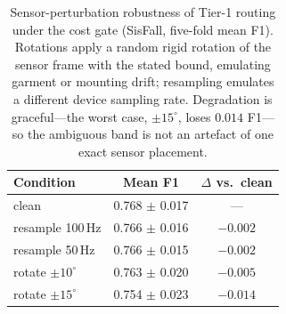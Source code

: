 \begin{table}[!t]
\centering
\caption{Sensor-perturbation robustness of Tier-1 routing under the cost gate (SisFall, five-fold mean F1). Rotations apply a random rigid rotation of the sensor frame with the stated bound, emulating garment or mounting drift; resampling emulates a different device sampling rate. Degradation is graceful---the worst case, $\pm15^\circ$, loses $0.014$ F1---so the ambiguous band is not an artefact of one exact sensor placement.}
\label{tab:robustness}
\begin{tabular}{lcc}
\toprule
Condition & Mean F1 & $\Delta$ vs.\ clean \\
\midrule
clean             & 0.768 $\pm$ 0.017 & --- \\
resample 100\,Hz  & 0.766 $\pm$ 0.016 & $-0.002$ \\
resample 50\,Hz   & 0.766 $\pm$ 0.015 & $-0.002$ \\
rotate $\pm10^\circ$ & 0.763 $\pm$ 0.020 & $-0.005$ \\
rotate $\pm15^\circ$ & 0.754 $\pm$ 0.023 & $-0.014$ \\
\bottomrule
\end{tabular}
\end{table}
